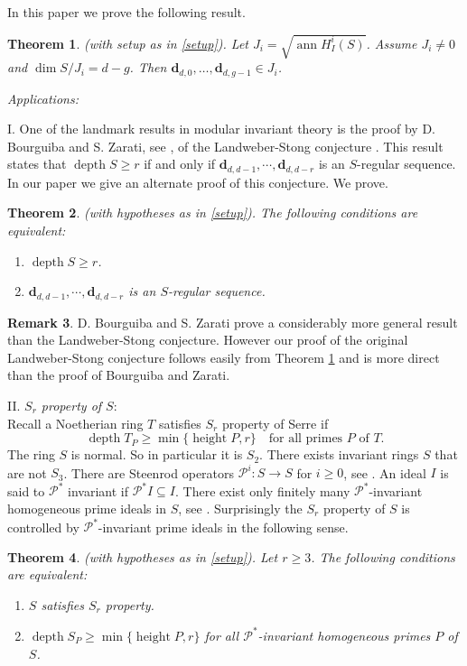 \documentclass{amsart}
\newcommand{\db}{\mathbf{d} }
\newcommand{\Pc}{\mathcal{P} }
\newcommand{\rt}{\rightarrow}
\newcommand{\depth}{\operatorname{depth}}
\newcommand{\ann}{\operatorname{ann}}
\newcommand{\height}{\operatorname{height}}
\theoremstyle{plain}
\newtheorem{theorem}{Theorem}[section]
\theoremstyle{definition}
\newtheorem{remark}[theorem]{Remark}
\theoremstyle{remark}
\begin{document}
In this paper we prove the following result.
\begin{theorem}\label{main}
(with setup as in \ref{setup}).  Let  $J_i = \sqrt{\ann H^i_I(S)}$. Assume $J_i \neq 0$ and $\dim S/J_i = d - g$. Then
$\db_{d,0}, \ldots, \db_{d, g - 1} \in J_i$.
\end{theorem}

\emph{Applications:}

I. One of the landmark results in modular invariant theory is the proof  by D. Bourguiba and S. Zarati, see \cite{bz}, of
the Landweber-Stong conjecture \cite{LS}. This result states that $\depth S \geq r$ if and only if $\db_{d,d-1}, \cdots, \db_{d, d-r}$ is an $S$-regular sequence. In our paper we give an  alternate proof of this conjecture. We prove.
\begin{theorem}\label{ls}(with hypotheses as in \ref{setup}).  The following conditions are equivalent:
  \begin{enumerate}[\rm (i)]
    \item $\depth S \geq r $.
    \item $\db_{d,d-1}, \cdots, \db_{d, d-r}$ is an $S$-regular sequence.
  \end{enumerate}
\end{theorem}
\begin{remark}
D. Bourguiba and S. Zarati prove a considerably more general result than
the Landweber-Stong conjecture. However our proof of the original   Landweber-Stong conjecture follows easily from Theorem \ref{main} and is more direct than the proof of  Bourguiba and  Zarati.
\end{remark}
II. \emph{$S_r$ property of $S$}: \\
Recall a Noetherian ring $T$ satisfies $S_r$ property of Serre if
$$ \depth T_P \geq \min\{\height P, r \} \quad \text{for all primes $P$ of $T$}. $$
The ring $S$ is normal. So in particular it is $S_2$. There exists invariant rings $S$ that are not $S_3$. There are Steenrod operators $\Pc^i \colon S \rt S$ for $i \geq 0$, see \cite[Chapter 11]{SL}.
An ideal $I$ is said to $\Pc^*$ invariant if $\Pc^* I \subseteq I$. There exist only finitely many $\Pc^*$-invariant homogeneous  prime ideals in $S$, see \cite[11.4.8]{SL}. Surprisingly the $S_r$ property of $S$ is controlled by $\Pc^*$-invariant prime ideals in the following sense.
\begin{theorem}\label{sr}(with hypotheses as in \ref{setup}). Let $r \geq 3$. The following conditions are equivalent:
  \begin{enumerate}[\rm (i)]
    \item $S$ satisfies $S_r$ property.
    \item $\depth S_P \geq \min\{\height P, r \}$  for all $\Pc^*$-invariant homogeneous primes $P$ of $S$.
  \end{enumerate}
\end{theorem}
\end{document}
